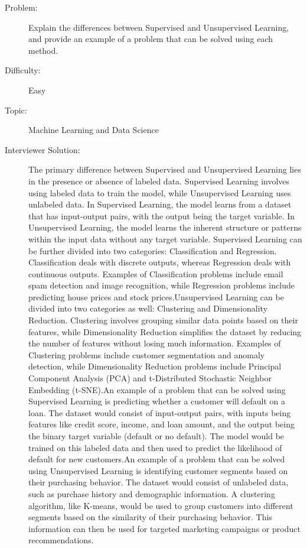 \documentclass{article}%
\begin{document}
\begin{description}%
\item[Problem: ]%
Explain the differences between Supervised and Unsupervised Learning, and provide an example of a problem that can be solved using each method.%
\item[Difficulty: ]%
Easy%
\item[Topic: ]%
Machine Learning and Data Science%
\item[Interviewer Solution: ]%
The primary difference between Supervised and Unsupervised Learning lies in the presence or absence of labeled data. Supervised Learning involves using labeled data to train the model, while Unsupervised Learning uses unlabeled data. In Supervised Learning, the model learns from a dataset that has input{-}output pairs, with the output being the target variable. In Unsupervised Learning, the model learns the inherent structure or patterns within the input data without any target variable. Supervised Learning can be further divided into two categories: Classification and Regression. Classification deals with discrete outputs, whereas Regression deals with continuous outputs. Examples of Classification problems include email spam detection and image recognition, while Regression problems include predicting house prices and stock prices.Unsupervised Learning can be divided into two categories as well: Clustering and Dimensionality Reduction. Clustering involves grouping similar data points based on their features, while Dimensionality Reduction simplifies the dataset by reducing the number of features without losing much information. Examples of Clustering problems include customer segmentation and anomaly detection, while Dimensionality Reduction problems include Principal Component Analysis (PCA) and t{-}Distributed Stochastic Neighbor Embedding (t{-}SNE).An example of a problem that can be solved using Supervised Learning is predicting whether a customer will default on a loan. The dataset would consist of input{-}output pairs, with inputs being features like credit score, income, and loan amount, and the output being the binary target variable (default or no default). The model would be trained on this labeled data and then used to predict the likelihood of default for new customers.An example of a problem that can be solved using Unsupervised Learning is identifying customer segments based on their purchasing behavior. The dataset would consist of unlabeled data, such as purchase history and demographic information. A clustering algorithm, like K{-}means, would be used to group customers into different segments based on the similarity of their purchasing behavior. This information can then be used for targeted marketing campaigns or product recommendations.%

\end{description}
\end{document}
